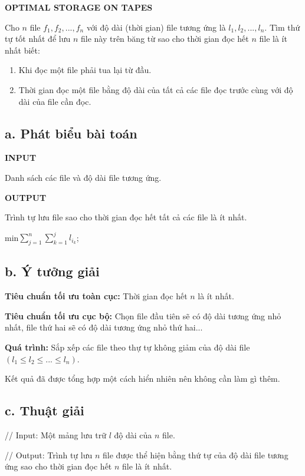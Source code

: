 \documentclass[12pt, a4paper, fleqn]{article}
\begin{document}
	
	\textbf{OPTIMAL STORAGE ON TAPES}
	
	Cho $n$ file $f_1, f_2, ..., f_n$ với độ dài (thời gian) file
	tương ứng là $l_1, l_2, ..., l_n$. Tìm thứ tự tốt nhất để lưu $n$ file này trên băng từ sao cho thời gian đọc hết $n$ file là ít nhất biết:
	\begin{enumerate}
		\item Khi đọc một file phải tua lại từ đầu.
		\item Thời gian đọc một file bằng độ dài của tất cả các
		file đọc trước cùng với độ dài của file cần đọc.
	\end{enumerate}
	
	\subsection*{a. Phát biểu bài toán}
	
	\textbf{INPUT}
	
	Danh sách các file và độ dài file tương ứng.
	
	\textbf{OUTPUT}
	
	Trình tự lưu file sao cho thời gian đọc hết tất cả các file là ít nhất.
	
	min$\displaystyle \sum_{j = 1}^{n} \sum_{k = 1}^{j} l_{i_k}$;
	
	\subsection*{b. Ý tưởng giải}
	
	\textbf{Tiêu chuẩn tối ưu toàn cục:} Thời gian đọc hết $n$ là ít nhất.
	
	\textbf{Tiêu chuẩn tối ưu cục bộ:} Chọn file đầu tiên sẽ có độ dài tương ứng nhỏ nhất, file thứ hai sẽ có độ dài tương ứng nhỏ thứ hai...
	
	\textbf{Quá trình:} Sắp xếp các file theo thự tự không giảm của độ dài file $(l_1 \leq l_2 \leq ... \leq l_n)$.
	
	Kết quả đã được tổng hợp một cách hiển nhiên nên không cần làm gì thêm.
	
	\subsection*{c. Thuật giải}
	
		// Input: Một mảng lưu trữ $l$ độ dài của $n$ file.
		
		// Output: Trình tự lưu $n$ file được thể hiện bằng thứ tự của độ dài file tương ứng sao cho thời gian đọc hết $n$ file là ít nhất.
	
\end{document}
